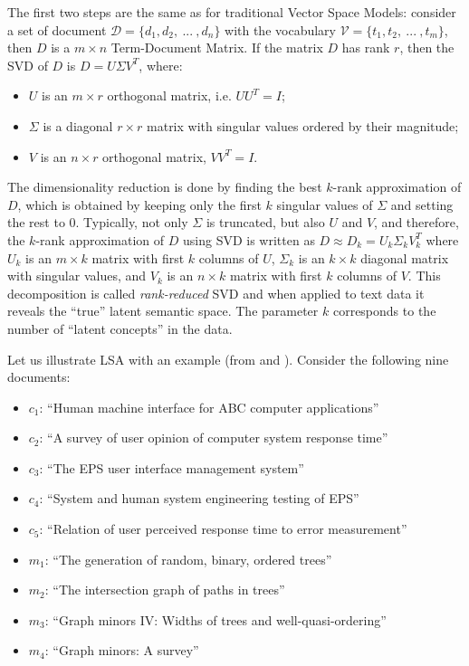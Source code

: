 The first two steps are the same as for traditional Vector Space Models:
consider a set of document $\mathcal D = \{ d_1, d_2, \ ... \ , d_n \}$
with the vocabulary $\mathcal V = \{t_1, t_2, \ ... \ , t_m \}$, then 
$D$ is a $m \times n$ Term-Document Matrix. If the matrix $D$ has 
rank $r$, then the SVD of $D$ is $D = U  \Sigma V^T$, where:

\begin{itemize}
\itemsep1pt\parskip0pt
\item $U$ is an $m \times r$ orthogonal matrix, i.e. $U U^T = I$;
\item $\Sigma$ is a diagonal $r \times r$ matrix with singular values ordered by their magnitude;
\item $V$ is an $n \times r$ orthogonal matrix, $V V^T = I$.
\end{itemize}

The dimensionality reduction is done by finding the best $k$-rank approximation 
of $D$, which is obtained by keeping only the first $k$ singular values of $\Sigma$
and setting the rest to 0. 
Typically, not only $\Sigma$ is truncated, but also $U$ and $V$, 
and therefore, the $k$-rank approximation of $D$ using SVD is written as
$D \approx D_k = U_k \Sigma_k V_k^T$ where $U_k$ is an $m \times k$ 
matrix with first $k$ columns of $U$, $\Sigma_k$ is an $k \times k$ 
diagonal matrix with singular values, and $V_k$ is an $n \times k$ 
matrix with first $k$ columns of $V$.  This decomposition 
is called \emph{rank-reduced} SVD and when applied to text data 
it reveals the ``true'' latent semantic space. The parameter $k$ corresponds 
to the number of ``latent concepts'' in the data. 

Let us illustrate LSA with an example (from \cite{deerwester1990indexing}
and \cite{landauer1998introduction}). Consider the following nine documents:

\begin{itemize}
\itemsep1pt\parskip0pt
\item $c_1$: ``Human machine interface for ABC computer applications''
\item $c_2$: ``A survey of user opinion of computer system response time''
\item $c_3$: ``The EPS user interface management system''
\item $c_4$: ``System and human system engineering testing of EPS''
\item $c_5$: ``Relation of user perceived response time to error measurement''
\item $m_1$: ``The generation of random, binary, ordered trees''
\item $m_2$: ``The intersection graph of paths in trees''
\item $m_3$: ``Graph minors IV: Widths of trees and well-quasi-ordering''
\item $m_4$: ``Graph minors: A survey''
\end{itemize}

